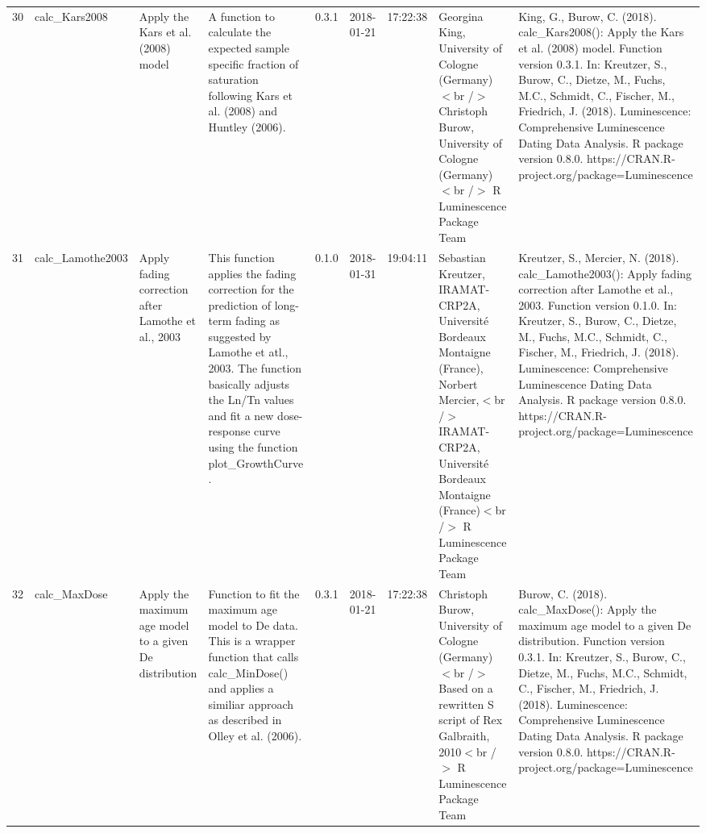 \begin{table}[ht]
\begin{tabular}{rllllllll}
 \\ 
  30 & calc\_Kars2008 & Apply the Kars et al. (2008) model & A function to calculate the expected sample specific fraction of saturation following Kars et al. (2008) and Huntley (2006). & 0.3.1 & 2018-01-21 & 17:22:38
 & Georgina King, University of Cologne (Germany) $<$br /$>$ Christoph Burow, University of Cologne (Germany)$<$br /$>$  R Luminescence Package Team & King, G., Burow, C. (2018). calc\_Kars2008(): Apply the Kars et al. (2008) model. Function version 0.3.1. In: Kreutzer, S., Burow, C., Dietze, M., Fuchs, M.C., Schmidt, C., Fischer, M., Friedrich, J. (2018). Luminescence: Comprehensive Luminescence Dating Data Analysis. R package version 0.8.0. https://CRAN.R-project.org/package=Luminescence
 \\ 
  31 & calc\_Lamothe2003 & Apply fading correction after Lamothe et al., 2003 & This function applies the fading correction for the prediction of long-term fading as suggested by Lamothe et atl., 2003. The function basically adjusts the Ln/Tn values and fit a new dose-response curve using the function  plot\_GrowthCurve . & 0.1.0 & 2018-01-31 & 19:04:11
 & Sebastian Kreutzer, IRAMAT-CRP2A, Université Bordeaux Montaigne (France), Norbert Mercier,$<$br /$>$ IRAMAT-CRP2A, Université Bordeaux Montaigne (France)$<$br /$>$  R Luminescence Package Team & Kreutzer, S., Mercier, N. (2018). calc\_Lamothe2003(): Apply fading correction after Lamothe et al., 2003. Function version 0.1.0. In: Kreutzer, S., Burow, C., Dietze, M., Fuchs, M.C., Schmidt, C., Fischer, M., Friedrich, J. (2018). Luminescence: Comprehensive Luminescence Dating Data Analysis. R package version 0.8.0. https://CRAN.R-project.org/package=Luminescence
 \\ 
  32 & calc\_MaxDose & Apply the maximum age model to a given De distribution & Function to fit the maximum age model to De data. This is a wrapper function that calls calc\_MinDose() and applies a similiar approach as described in Olley et al. (2006). & 0.3.1 & 2018-01-21 & 17:22:38
 & Christoph Burow, University of Cologne (Germany)  $<$br /$>$ Based on a rewritten S script of Rex Galbraith, 2010$<$br /$>$  R Luminescence Package Team & Burow, C. (2018). calc\_MaxDose(): Apply the maximum age model to a given De distribution. Function version 0.3.1. In: Kreutzer, S., Burow, C., Dietze, M., Fuchs, M.C., Schmidt, C., Fischer, M., Friedrich, J. (2018). Luminescence: Comprehensive Luminescence Dating Data Analysis. R package version 0.8.0. https://CRAN.R-project.org/package=Luminescence
 \\ 

\end{tabular}
\end{table}
